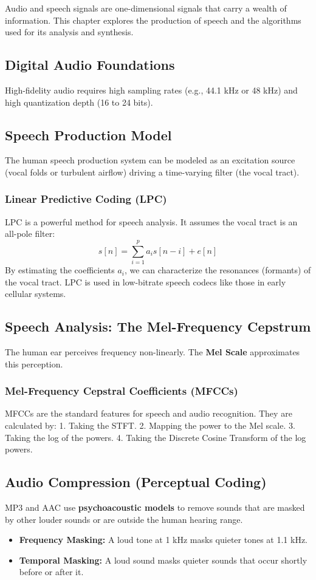 
Audio and speech signals are one-dimensional signals that carry a wealth of information. This chapter explores the production of speech and the algorithms used for its analysis and synthesis.

\subsection{Digital Audio Foundations}
High-fidelity audio requires high sampling rates (e.g., 44.1 kHz or 48 kHz) and high quantization depth (16 to 24 bits).

\subsection{Speech Production Model}
The human speech production system can be modeled as an excitation source (vocal folds or turbulent airflow) driving a time-varying filter (the vocal tract).

\subsubsection{Linear Predictive Coding (LPC)}
LPC is a powerful method for speech analysis. It assumes the vocal tract is an all-pole filter:
\begin{equation}
    s[n] = \sum_{i=1}^{p} a_i s[n-i] + e[n]
\end{equation}
By estimating the coefficients $a_i$, we can characterize the resonances (formants) of the vocal tract. LPC is used in low-bitrate speech codecs like those in early cellular systems.

\subsection{Speech Analysis: The Mel-Frequency Cepstrum}
The human ear perceives frequency non-linearly. The \textbf{Mel Scale} approximates this perception.
\subsubsection{Mel-Frequency Cepstral Coefficients (MFCCs)}
MFCCs are the standard features for speech and audio recognition. They are calculated by:
1. Taking the STFT.
2. Mapping the power to the Mel scale.
3. Taking the log of the powers.
4. Taking the Discrete Cosine Transform of the log powers.

\subsection{Audio Compression (Perceptual Coding)}
MP3 and AAC use \textbf{psychoacoustic models} to remove sounds that are masked by other louder sounds or are outside the human hearing range.
\begin{itemize}
    \item \textbf{Frequency Masking:} A loud tone at 1 kHz masks quieter tones at 1.1 kHz.
    \item \textbf{Temporal Masking:} A loud sound masks quieter sounds that occur shortly before or after it.
\end{itemize}

